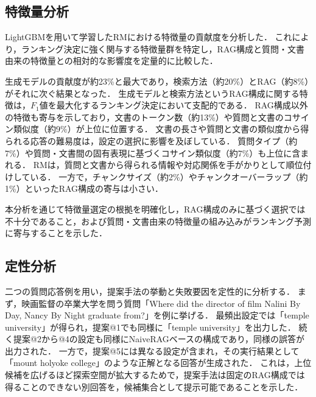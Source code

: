 \subsection{特徴量分析} \label{sec5.6}
LightGBMを用いて学習したRMにおける特徴量の貢献度を分析した．
これにより，ランキング決定に強く関与する特徴量群を特定し，RAG構成と質問・文書由来の特徴量との相対的な影響度を定量的に比較した．

生成モデルの貢献度が約23\%と最大であり，検索方法（約20\%）とRAG（約8\%）がそれに次ぐ結果となった．
生成モデルと検索方法というRAG構成に関する特徴は，$F_1$値を最大化するランキング決定において支配的である．
RAG構成以外の特徴も寄与を示しており，文書のトークン数（約13\%）や質問と文書のコサイン類似度（約9\%）が上位に位置する．
文書の長さや質問と文書の類似度から得られる応答の難易度は，設定の選択に影響を及ぼしている．
質問タイプ（約7\%）や質問・文書間の固有表現に基づくコサイン類似度（約7\%）も上位に含まれる．
RMは，質問と文書から得られる情報や対応関係を手がかりとして順位付けしている．
一方で，チャンクサイズ（約2\%）やチャンクオーバーラップ（約1\%）といったRAG構成の寄与は小さい．

本分析を通じて特徴量選定の根拠を明確化し，RAG構成のみに基づく選択では不十分であること，および質問・文書由来の特徴量の組み込みがランキング予測に寄与することを示した．


\subsection{定性分析} \label{sec5.7}
二つの質問応答例を用い，提案手法の挙動と失敗要因を定性的に分析する．
まず，映画監督の卒業大学を問う質問「Where did the director of film Nalini By Day, Nancy By Night graduate from?」を例に挙げる．
最頻出設定では「temple university」が得られ，提案@1でも同様に「temple university」を出力した．
続く提案@2から@4の設定も同様にNaiveRAGベースの構成であり，同様の誤答が出力された．
一方で，提案@5には異なる設定が含まれ，その実行結果として「mount holyoke college」のような正解となる回答が生成された．
これは，上位候補を広げるほど探索空間が拡大するためで，提案手法は固定のRAG構成では得ることのできない別回答を，候補集合として提示可能であることを示した．

